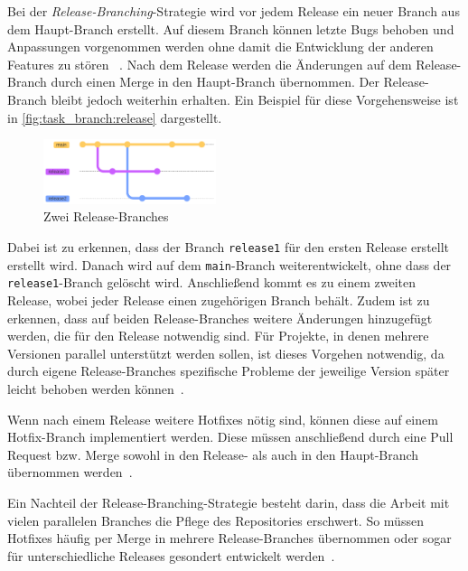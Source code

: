Bei der \emph{Release\hyp Branching}\hyp Strategie wird vor jedem Release ein neuer Branch aus dem Haupt\hyp Branch erstellt. Auf diesem Branch können letzte Bugs behoben und Anpassungen vorgenommen werden ohne damit die Entwicklung der anderen Features zu stören ~\cite{tucker_basics_2023}. Nach dem Release werden die Änderungen auf dem Release\hyp Branch durch einen Merge in den Haupt\hyp Branch übernommen. Der Release\hyp Branch bleibt jedoch weiterhin erhalten. Ein Beispiel für diese Vorgehensweise ist in \autoref{fig:task_branch:release} dargestellt.

\begin{figure}
    \includegraphics[width=0.45\textwidth]{src/assets/diagrams/task_branch/release-branch.pdf}
    \caption{Zwei Release\hyp Branches}
    \label{fig:task_branch:release}
\end{figure}

Dabei ist zu erkennen, dass der Branch \texttt{release1} für den ersten Release erstellt erstellt wird. Danach wird auf dem \texttt{main}\hyp Branch weiterentwickelt, ohne dass der \texttt{release1}-Branch gelöscht wird. Anschließend kommt es zu einem zweiten Release, wobei jeder Release einen zugehörigen Branch behält. Zudem ist zu erkennen, dass auf beiden Release\hyp Branches weitere Änderungen hinzugefügt werden, die für den Release notwendig sind.
Für Projekte, in denen mehrere Versionen parallel unterstützt werden sollen, ist dieses Vorgehen notwendig, da durch eigene Release\hyp Branches spezifische Probleme der jeweilige Version später leicht behoben werden können~\cite{hart_besten_2020}.

Wenn nach einem Release weitere Hotfixes nötig sind, können diese auf einem Hotfix\hyp Branch implementiert werden. Diese müssen anschließend durch eine Pull Request bzw. Merge sowohl in den Release- als auch in den Haupt\hyp Branch übernommen werden~\cite{tucker_basics_2023}.

Ein Nachteil der Release\hyp Branching\hyp Strategie besteht darin, dass die Arbeit mit vielen parallelen Branches die Pflege des Repositories erschwert. So müssen Hotfixes häufig per Merge in mehrere Release\hyp Branches übernommen oder sogar für unterschiedliche Releases gesondert entwickelt werden~\cite{hart_besten_2020}.


